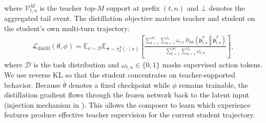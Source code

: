 \documentclass{article} %
\begin{document}
where $\mathcal{V}_{t,n}^{M}$ is the teacher top-$M$ support at prefix $(t,n)$ and $\bot$ denotes the aggregated tail event.
The distillation objective matches teacher and student on the student's own multi-turn trajectory:
\begin{equation}
\begin{aligned}
\mathcal{L}_{\mathrm{distill}}(\theta,\phi)
=
\mathbb{E}_{x\sim\mathcal{D}}\mathbb{E}_{\boldsymbol{\tau}\sim\pi_\theta^{S}(\cdot\mid x)}
\left[
\frac{
\sum_{t=1}^{|\boldsymbol{\tau}|}\sum_{n=1}^{L_t}
\omega_{t,n}\,
D_{\mathrm{KL}}\!\left(\tilde{\boldsymbol{p}}^{S}_{t,n}\middle\|\tilde{\boldsymbol{p}}^{T}_{t,n}\right)}
{\sum_{t=1}^{|\boldsymbol{\tau}|}\sum_{n=1}^{L_t}\omega_{t,n}}
\right],
\end{aligned}
\label{eq:lopd-distill}
\end{equation}
where $\mathcal{D}$ is the task distribution and $\omega_{t,n}\in\{0,1\}$ masks supervised action tokens. We use reverse KL so that the student concentrates on teacher-supported behavior. Because $\bar{\theta}$ denotes a fixed checkpoint while $\phi$ remains trainable, the distillation gradient flows through the frozen network back to the latent input (injection mechanism in ). This allows the composer to learn which experience features produce effective teacher supervision for the current student trajectory.

\vspace{-0.4em}
\end{document}
